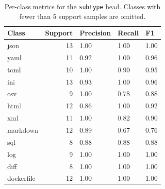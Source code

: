 \documentclass[11pt,a4paper]{article}
\begin{document}
\begin{table}[h]
\centering
\begin{tabular}{lrlll}
\toprule
Class & Support & Precision & Recall & F1 \\
\midrule
json       & 13 & 1.00  & 1.00  & 1.00 \\
yaml       & 11 & 0.92  & 1.00  & 0.96 \\
toml       & 10 & 1.00  & 0.90  & 0.95 \\
ini        & 13 & 0.93  & 1.00  & 0.96 \\
csv        & 9  & 1.00  & 0.78  & 0.88 \\
html       & 12 & 0.86  & 1.00  & 0.92 \\
xml        & 11 & 1.00  & 0.82  & 0.90 \\
markdown   & 12 & 0.89  & 0.67  & 0.76 \\
sql        & 8  & 0.88  & 0.88  & 0.88 \\
log        & 9  & 1.00  & 1.00  & 1.00 \\
diff       & 8  & 1.00  & 1.00  & 1.00 \\
dockerfile & 12 & 1.00  & 1.00  & 1.00 \\
\bottomrule
\end{tabular}
\caption{\label{tab:perclass} Per-class metrics for the \texttt{subtype} head. Classes with fewer than 5 support samples are omitted.}
\end{table}
\end{document}
